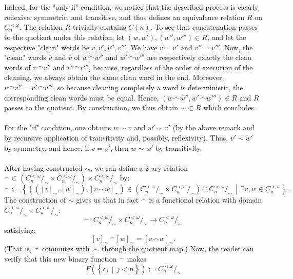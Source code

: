 \documentclass[11pt, a4paper, oneside]{article}
\theoremstyle{remark}
\theoremstyle{lemma}
\begin{document}
\\\\
Indeed, for the "only if" condition, we notice that the described process is clearly reflexive, symmetric, and transitive, and thus defines an equivalence relation \(R\) on \(C_n^{<\omega}\). The relation \(R\) trivially contains \(C(n)\). To see that concatenation passes to the quotient under this relation, let \((w, w'), (w'', w''') \in R\), and let the respective "clean" words be \(v, v', v'', v'''\). We have \(v = v'\) and \(v'' = v'''\). Now, the "clean" words \(\overline{v}\) and \(\overline{\overline{v}}\) of \(w \frown w''\) and \(w' \frown w'''\) are respectively exactly the clean words of \(v \frown v''\) and \(v' \frown v'''\), because, regardless of the order of execution of the cleaning, we always obtain the same clean word in the end. Moreover, \(v \frown v'' = v' \frown v'''\), so because cleaning completely a word is deterministic, the corresponding clean words must be equal. Hence, \((w\frown w'',w'\frown w''')\in R\) and \(R\) passes to the quotient. By construction, we thus obtain \(\sim \subset R\) which concludes.
\\\\
For the "if" condition, one obtains \(w \sim v\) and \(w' \sim v'\) (by the above remark and by recursive application of transitivity and, possibly, reflexivity). Thus, \(v' \sim w'\) by symmetry, and hence, if \(v = v'\), then \(w \sim w'\) by transitivity.
\\\\
After having constructed $\sim$, we can define a $2$-ary relation $^{\smallfrown}\subset \left(C_n^{< \omega}/_{\sim}\times C_n^{< \omega}/_{\sim}\right)\times C_n^{< \omega}/_{\sim}$ by:
\[
^{\smallfrown}:=\left\{\left(\left(\left[v\right]_{\sim},\left[w\right]_{\sim}\right),\left[v \frown w\right]_{\sim}\right)\in\left(C_n^{< \omega}/_{\sim}\times C_n^{< \omega}/_{\sim}\right)\times C_n^{< \omega}/_{\sim}\,\middle|\, \exists v,w\in C_n^{< \omega}\right\}.
\]
The construction of $\sim$ gives us that in fact $^{\smallfrown}$ is a functional relation with domain $C_n^{< \omega}/_{\sim}\times C_n^{< \omega}/_{\sim}$:
$$^{\smallfrown} : C_n^{< \omega}/_{\sim} \times C_n^{< \omega}/_{\sim} \rightarrow C_n^{< \omega}/_{\sim}$$ satisfying:
\[
\left[v\right]_{\sim} \,^{\smallfrown} \left[w\right]_{\sim} = \left[v \frown w\right]_{\sim}.
\]
(That is, $^{\smallfrown}$ commutes with $\frown$ through the quotient map.)
Now, the reader can verify that this new binary function \(^{\smallfrown}\) makes 
\[
F\left(\left\{c_j \,\middle|\, j < n\right\}\right) := C_n^{< \omega}/_{\sim}
\] 
\end{document}
